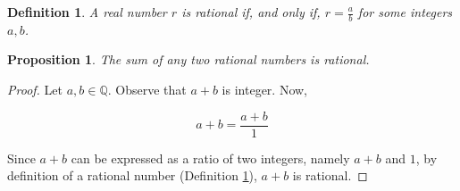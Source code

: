 \documentclass{article}
\newtheorem{definition}{Definition}
\newtheorem{proposition}{Proposition}
\begin{document}
\begin{definition}
\label{def:rational-number}
A real number $r$ is rational if, and only if, $r=\frac{a}{b}$ for some integers $a,b$.
\end{definition}

\begin{proposition}
The sum of any two rational numbers is rational.
\end{proposition}

\begin{proof}
Let $a,b \in \mathbb{Q}$. Observe that $a+b$ is integer. Now,

\[
a+b=\frac{a+b}{1}
\]

Since $a+b$ can be expressed as a ratio of two integers, namely $a+b$ and $1$, by
definition of a rational number (Definition \ref{def:rational-number}),
$a+b$ is rational.
\end{proof}
\end{document}
